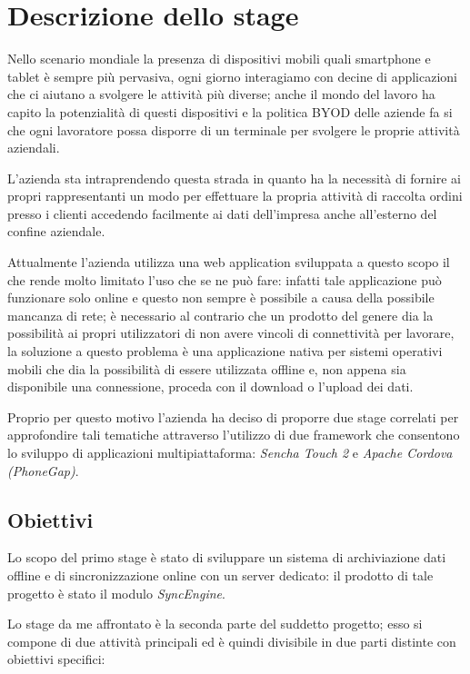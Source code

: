 \section{Descrizione dello stage}
Nello scenario mondiale la presenza di dispositivi mobili quali smartphone e tablet è sempre più pervasiva, ogni giorno interagiamo con decine di applicazioni che ci aiutano a svolgere le attività più diverse; anche il mondo del lavoro ha capito la potenzialità di questi dispositivi e la politica \ac{BYOD} delle aziende fa si che ogni lavoratore possa disporre di un terminale per svolgere le proprie attività aziendali.

L'azienda \myCompany sta intraprendendo questa strada in quanto ha la necessità di fornire ai propri rappresentanti un modo per effettuare la propria attività di raccolta ordini presso i clienti accedendo facilmente ai dati dell'impresa anche all'esterno del confine aziendale.

Attualmente l'azienda utilizza una web application sviluppata a questo scopo il che rende molto limitato l'uso che se ne può fare: infatti tale applicazione può funzionare solo online e questo non sempre è possibile a causa della possibile mancanza di rete; è necessario al contrario che un prodotto del genere dia la possibilità ai propri utilizzatori di non avere vincoli di connettività per lavorare, la soluzione a questo problema è una applicazione nativa per sistemi operativi mobili che dia la possibilità di essere utilizzata offline e, non appena sia disponibile una connessione, proceda con il download o l'upload dei dati.

Proprio per questo motivo l'azienda ha deciso di proporre due stage correlati per approfondire tali tematiche attraverso l'utilizzo di due framework che consentono lo sviluppo di applicazioni multipiattaforma: \emph{Sencha Touch 2} e \emph{Apache Cordova (PhoneGap)}.


\subsection{Obiettivi}
Lo scopo del primo stage è stato di sviluppare un sistema di archiviazione dati offline e di sincronizzazione online con un server dedicato: il prodotto di tale progetto è stato il modulo \emph{SyncEngine}.

Lo stage da me affrontato è la seconda parte del suddetto progetto; esso si compone di due attività principali ed è quindi divisibile in due parti distinte con obiettivi specifici:

